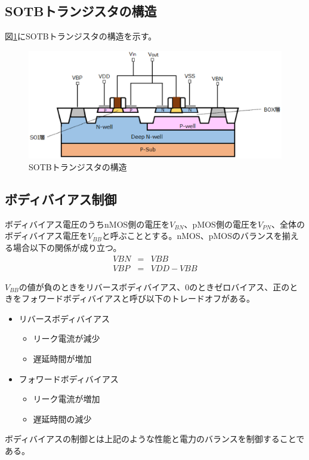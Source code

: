 \subsection{SOTBトランジスタの構造}
図\ref{fig:sotb}にSOTBトランジスタの構造を示す。\cite{sotb_book}
\begin{figure}[h]
\centering
\includegraphics[width=12cm]{./chap2/fig/sotb.eps}
\caption{SOTBトランジスタの構造}
\label{fig:sotb}
\end{figure}
\subsection{ボディバイアス制御}
ボディバイアス電圧のうちnMOS側の電圧を$V_{BN}$、pMOS側の電圧を$V_{PN}$、全体のボディバイアス電圧を$V_{BB}$と呼ぶこととする。nMOS、pMOSのバランスを揃える場合以下の関係が成り立つ。
\begin{eqnarray}
VBN & = & VBB \\
VBP & = & VDD - VBB
\end{eqnarray}

$V_{BB}$の値が負のときをリバースボディバイアス、0のときゼロバイアス、正のときをフォワードボディバイアスと呼び以下のトレードオフがある。
\begin{itemize}
\item リバースボディバイアス
	\begin{itemize}
	\item リーク電流が減少
	\item 遅延時間が増加
	\end{itemize}
\item フォワードボディバイアス
	\begin{itemize}
	\item リーク電流が増加
	\item 遅延時間の減少
	\end{itemize}
\end{itemize}

ボディバイアスの制御とは上記のような性能と電力のバランスを制御することである。
